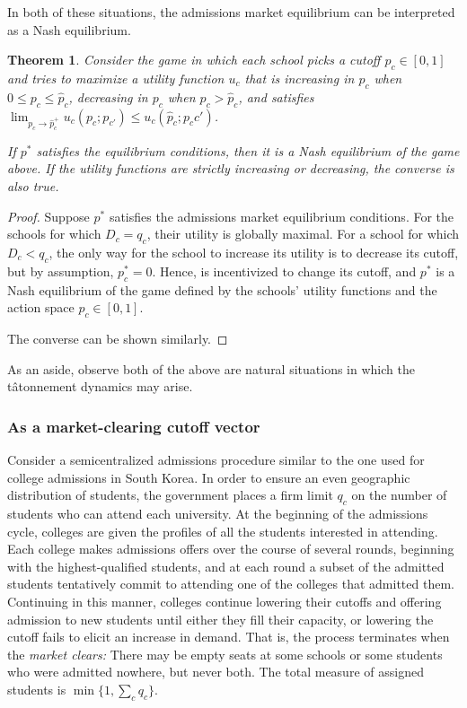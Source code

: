 \documentclass[12pt]{article}
\newtheorem{theorem}{Theorem}
\theoremstyle{definition}
\begin{document}
In both of these situations, the admissions market equilibrium can be interpreted as a Nash equilibrium. 
\begin{theorem}
Consider the game in which each school picks a cutoff $p_c \in [0,1]$ and tries to maximize a utility function $u_c$ that is increasing in $p_c$ when $0 \leq p_c \leq \hat p_c$, decreasing in $p_c$ when $p_c > \hat p_c$, and satisfies $\lim_{p_c \to \hat p_c^+} u_c(p_c; p_{c'}) \leq  u_c(\hat p_c; p_c{c'})$.

If $p^*$ satisfies the equilibrium conditions, then it is a Nash equilibrium of the game above. If the utility functions are strictly increasing or decreasing, the converse is also true.
\end{theorem}
\begin{proof} Suppose $p^*$ satisfies the admissions market equilibrium conditions. For the schools for which $D_c = q_c$, their utility is globally maximal. For a school for which $D_c < q_c$, the only way for the school to increase its utility is to decrease its cutoff, but by assumption, $p_c^* = 0$. Hence, is incentivized to change its cutoff, and $p^*$ is a Nash equilibrium of the game defined by the schools' utility functions and the action space $p_c \in [0, 1]$.

The converse can be shown similarly.\end{proof}

As an aside, observe both of the above are natural situations in which the t\^{atonnement} dynamics may arise.

\subsubsection{As a market-clearing cutoff vector} \label{mktclearingproc}
Consider a semicentralized admissions procedure similar to the one used for college admissions in South Korea. In order to ensure an even geographic distribution of students, the government places a firm limit $q_c$ on the number of students who can attend each university. At the beginning of the admissions cycle, colleges are given the profiles of all the students interested in attending. Each college makes admissions offers over the course of several rounds, beginning with the highest-qualified students, and at each round a subset of the admitted students tentatively commit to attending one of the colleges that admitted them. Continuing in this manner, colleges continue lowering their cutoffs and offering admission to new students until either they fill their capacity, or lowering the cutoff fails to elicit an increase in demand. That is, the process terminates when the \emph{market clears:} There may be empty seats at some schools or some students who were admitted nowhere, but never both. The total measure of assigned students is $\min\{1, \sum_c q_c\}$.
\end{document}
